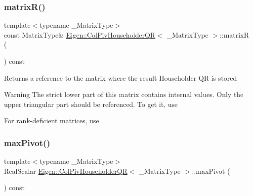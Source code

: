 \subsubsection{\texorpdfstring{matrixR()}{matrixR()}}
{\footnotesize\ttfamily template$<$typename \+\_\+\+Matrix\+Type$>$ \\
const Matrix\+Type\& \mbox{\hyperlink{class_eigen_1_1_col_piv_householder_q_r}{Eigen\+::\+Col\+Piv\+Householder\+QR}}$<$ \+\_\+\+Matrix\+Type $>$\+::matrixR (\begin{DoxyParamCaption}{ }\end{DoxyParamCaption}) const\hspace{0.3cm}{\ttfamily [inline]}}

\begin{DoxyReturn}{Returns}
a reference to the matrix where the result Householder QR is stored 
\end{DoxyReturn}
\begin{DoxyWarning}{Warning}
The strict lower part of this matrix contains internal values. Only the upper triangular part should be referenced. To get it, use 
\begin{DoxyCode}{0}
\end{DoxyCode}
 For rank-\/deficient matrices, use 
\begin{DoxyCode}{0}
\end{DoxyCode}
 
\end{DoxyWarning}
\mbox{\label{class_eigen_1_1_col_piv_householder_q_r_aac8c43d720170980f582d01494df9e8f}} 
\subsubsection{\texorpdfstring{maxPivot()}{maxPivot()}}
{\footnotesize\ttfamily template$<$typename \+\_\+\+Matrix\+Type$>$ \\
Real\+Scalar \mbox{\hyperlink{class_eigen_1_1_col_piv_householder_q_r}{Eigen\+::\+Col\+Piv\+Householder\+QR}}$<$ \+\_\+\+Matrix\+Type $>$\+::max\+Pivot (\begin{DoxyParamCaption}{ }\end{DoxyParamCaption}) const\hspace{0.3cm}{\ttfamily [inline]}}

